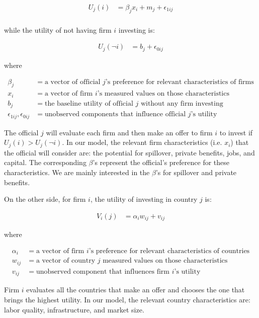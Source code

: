 \begin{align}
U_j(i) &= \beta_j x_i + m_j + \epsilon_{1ij} \\
\end{align}

while the utility of not having firm $i$ investing is:

\begin{align}
U_j(\neg i) &= b_j + \epsilon_{0ij}
\end{align}

where

\begin{align*}
\beta_j &= \text{a vector of official $j$'s preference for relevant characteristics of firms} \\
x_i &= \text{a vector of firm $i$'s measured values on those characteristics} \\
b_j &= \text{the baseline utility of official $j$ without any firm investing} \\
\epsilon_{1ij}, \epsilon_{0ij} &= \text{unobserved components that influence official $j$'s utility}
\end{align*}

The official $j$ will evaluate each firm and then make an offer to firm $i$ to invest if $U_j(i) > U_j(\neg i)$. In our model, the relevant firm characteristics (i.e. $x_i$) that the official will consider are: the potential for spillover, private benefits, jobs, and capital. The corresponding $\beta$'s represent the official's preference for these characteristics. We are mainly interested in the $\beta$'s for spillover and private benefits.

On the other side, for firm $i$, the utility of investing in country $j$ is:

\begin{align}
V_i(j) &= \alpha_i w_{ij} + v_{ij}
\end{align}

where

\begin{align*}
\alpha_i &= \text{a vector of firm $i$'s preference for relevant characteristics of countries} \\
w_{ij} &= \text{a vector of country $j$ measured values on those characteristics} \\
v_{ij} &= \text{unobserved component that influences firm $i$'s utility}
\end{align*}

Firm $i$ evaluates all the countries that make an offer and chooses the one that brings the highest utility. In our model, the relevant country characteristics are: labor quality, infrastructure, and market size.

